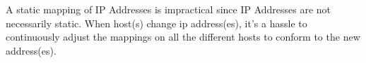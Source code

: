 A static mapping of IP Addresses is impractical since IP Addresses are not necessarily static. When host(s) change ip address(es), it's a hassle to continuously adjust the mappings on all the different hosts to conform to the new address(es).